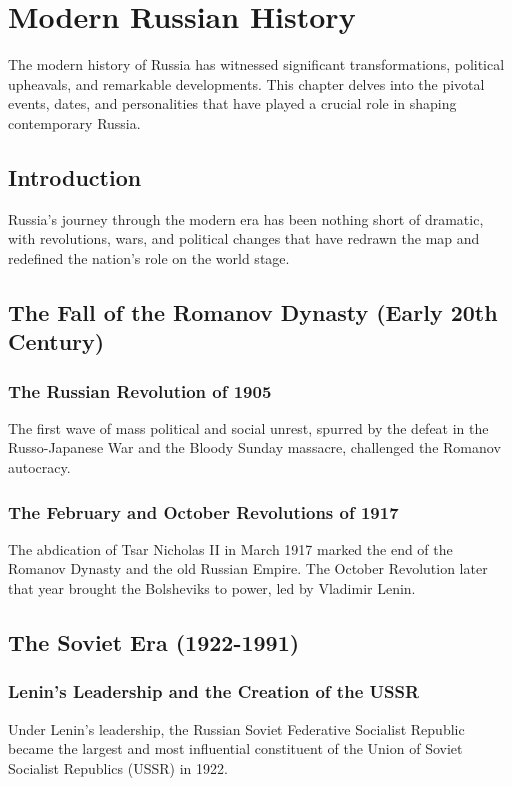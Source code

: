 \documentclass{book}
\begin{document}
\chapter{Modern Russian History}
\label{ch:modern-russian-history}

The modern history of Russia has witnessed significant transformations, political upheavals, and remarkable developments. This chapter delves into the pivotal events, dates, and personalities that have played a crucial role in shaping contemporary Russia.

\section{Introduction}
\label{sec:introduction-modern-russia}
Russia’s journey through the modern era has been nothing short of dramatic, with revolutions, wars, and political changes that have redrawn the map and redefined the nation’s role on the world stage.

\section{The Fall of the Romanov Dynasty (Early 20th Century)}
\label{sec:fall-romanov-dynasty}
\subsection{The Russian Revolution of 1905}
The first wave of mass political and social unrest, spurred by the defeat in the Russo-Japanese War and the Bloody Sunday massacre, challenged the Romanov autocracy.

\subsection{The February and October Revolutions of 1917}
The abdication of Tsar Nicholas II in March 1917 marked the end of the Romanov Dynasty and the old Russian Empire. The October Revolution later that year brought the Bolsheviks to power, led by Vladimir Lenin.

\section{The Soviet Era (1922-1991)}
\label{sec:soviet-era}
\subsection{Lenin’s Leadership and the Creation of the USSR}
Under Lenin’s leadership, the Russian Soviet Federative Socialist Republic became the largest and most influential constituent of the Union of Soviet Socialist Republics (USSR) in 1922.
\end{document}
